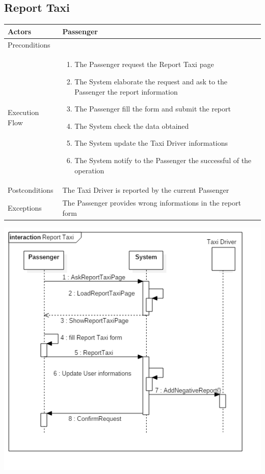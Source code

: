 \documentclass[english]{article}
\begin{document}
\subsection{Report Taxi}

\begin{tabular}{lp{8cm}}
\hline
Actors & Passenger \\
\hline
Preconditions & \\
\hline
Execution Flow &  
		\begin{enumerate}
			\item The Passenger request the Report Taxi page
			\item The System elaborate the request and ask to the Passenger the report information
			\item The Passenger fill the form and submit the report
			\item The System check the data obtained
			\item The System update the Taxi Driver informations
			\item The System notify to the Passenger the successful of the operation
		\end{enumerate} 
	\\ 
\hline
Postconditions & The Taxi Driver is reported by the current Passenger \\
\hline
Exceptions & The Passenger provides wrong informations in the report form
\end{tabular}

\includegraphics[width=\textwidth]{ReportTaxi}
\end{document}
